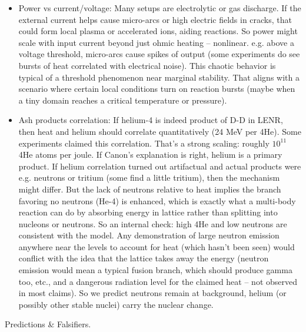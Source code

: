 \documentclass[11pt]{article}
\begin{document}
\begin{itemize}
\item 
Power vs current/voltage: Many setups are electrolytic or gas discharge. If the external current helps cause micro-arcs or high electric fields in cracks, that could form local plasma or accelerated ions, aiding reactions. So power might scale with input current beyond just ohmic heating – nonlinear. e.g. above a voltage threshold, micro-arcs cause spikes of output (some experiments do see bursts of heat correlated with electrical noise). This chaotic behavior is typical of a threshold phenomenon near marginal stability. That aligns with a scenario where certain local conditions turn on reaction bursts (maybe when a tiny domain reaches a critical temperature or pressure).




\item 
Ash products correlation: If helium-4 is indeed product of D-D in LENR, then heat and helium should correlate quantitatively (24 MeV per 4He). Some experiments claimed this correlation. That’s a strong scaling: roughly $10^{11}$ 4He atoms per joule. If Canon’s explanation is right, helium is a primary product. If helium correlation turned out artifactual and actual products were e.g. neutrons or tritium (some find a little tritium), then the mechanism might differ. But the lack of neutrons relative to heat implies the branch favoring no neutrons (He-4) is enhanced, which is exactly what a multi-body reaction can do by absorbing energy in lattice rather than splitting into nucleons or neutrons. So an internal check: high 4He and low neutrons are consistent with the model. Any demonstration of large neutron emission anywhere near the levels to account for heat (which hasn't been seen) would conflict with the idea that the lattice takes away the energy (neutron emission would mean a typical fusion branch, which should produce gamma too, etc., and a dangerous radiation level for the claimed heat – not observed in most claims). So we predict neutrons remain at background, helium (or possibly other stable nuclei) carry the nuclear change.




\end{itemize}

Predictions & Falsifiers.
\end{document}
